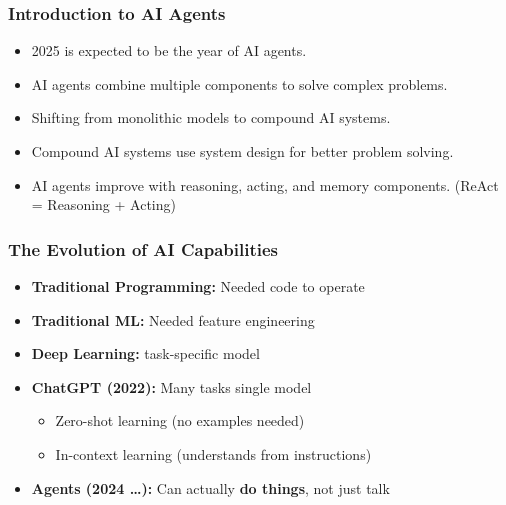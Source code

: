 \begin{frame}[fragile]\frametitle{Introduction to AI Agents}
    \begin{itemize}
        \item 2025 is expected to be the year of AI agents.
        \item AI agents combine multiple components to solve complex problems.
        \item Shifting from monolithic models to compound AI systems.
        \item Compound AI systems use system design for better problem solving.
        \item AI agents improve with reasoning, acting, and memory components. (ReAct = Reasoning + Acting)
    \end{itemize}
\end{frame}


\begin{frame}[fragile]\frametitle{The Evolution of AI Capabilities}
\begin{itemize}
    \item \textbf{Traditional Programming:} Needed code to operate
    \item \textbf{Traditional ML:} Needed feature engineering
    \item \textbf{Deep Learning:} task-specific model
    \item \textbf{ChatGPT (2022):} Many tasks single model
    \begin{itemize}
        \item Zero-shot learning (no examples needed)
        \item In-context learning (understands from instructions)
    \end{itemize}
    \item \textbf{Agents (2024 \ldots):} Can actually \textbf{do things}, not just talk
\end{itemize}
\end{frame}

